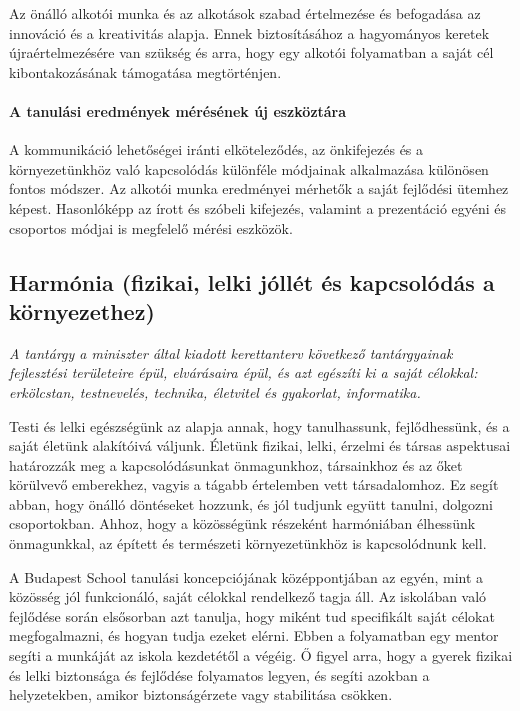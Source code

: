 Az önálló alkotói munka és az alkotások szabad értelmezése és befogadása az
innováció és a kreativitás alapja. Ennek biztosításához a hagyományos keretek
újraértelmezésére van szükség és arra, hogy egy alkotói folyamatban a saját cél
kibontakozásának támogatása megtörténjen.

\paragraph{A tanulási eredmények mérésének új eszköztára}

A kommunikáció lehetőségei iránti elköteleződés, az önkifejezés és a
környezetünkhöz való kapcsolódás különféle módjainak alkalmazása különösen
fontos módszer. Az alkotói munka eredményei mérhetők a saját fejlődési ütemhez
képest. Hasonlóképp az írott és szóbeli kifejezés, valamint a prezentáció
egyéni és csoportos módjai is megfelelő mérési eszközök.

\subsection[Harmónia]{Harmónia (fizikai, lelki jóllét és kapcsolódás a
  környezethez)}
\emph{A tantárgy a miniszter által kiadott kerettanterv következő tantárgyainak
  fejlesztési területeire épül, elvárásaira épül, és azt egészíti ki a saját célokkal: erkölcstan, testnevelés, technika,
  életvitel és gyakorlat, informatika.}

Testi és lelki egészségünk az alapja annak, hogy tanulhassunk, fejlődhessünk,
és a saját életünk alakítóivá váljunk. Életünk fizikai, lelki, érzelmi és
társas aspektusai határozzák meg a kapcsolódásunkat önmagunkhoz, társainkhoz és
az őket körülvevő emberekhez, vagyis a tágabb értelemben vett társadalomhoz. Ez
segít abban, hogy önálló döntéseket hozzunk, és jól tudjunk együtt tanulni,
dolgozni csoportokban. Ahhoz, hogy a közösségünk részeként harmóniában
élhessünk önmagunkkal, az épített és természeti környezetünkhöz is
kapcsolódnunk kell.

A Budapest School tanulási koncepciójának középpontjában az egyén, mint a
közösség jól funkcionáló, saját célokkal rendelkező tagja áll. Az iskolában
való fejlődése során elsősorban azt tanulja, hogy miként tud specifikált saját
célokat megfogalmazni, és hogyan tudja ezeket elérni. Ebben a folyamatban egy
mentor segíti a munkáját az iskola kezdetétől a végéig. Ő figyel arra, hogy a
gyerek fizikai és lelki biztonsága és fejlődése folyamatos legyen, és segíti
azokban a helyzetekben, amikor biztonságérzete vagy stabilitása csökken.

